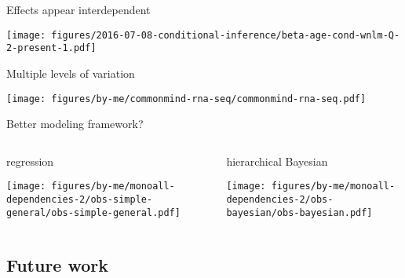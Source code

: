 \documentclass{beamer}
\newcommand{\platefigscale}[0]{0.7}
\begin{document}
\begin{frame}[label=interaction]{Effects appear interdependent}

\texttt{[image: figures/2016-07-08-conditional-inference/beta-age-cond-wnlm-Q-2-present-1.pdf]}
\end{frame}

\begin{frame}{Multiple levels of variation}
\begin{center}
\texttt{[image: figures/by-me/commonmind-rna-seq/commonmind-rna-seq.pdf]}
\end{center}
\end{frame}

\begin{frame}{Better modeling framework?}
\begin{columns}[t]
\begin{column}{0.5\textwidth}
\begin{center}
regression

\texttt{[image: figures/by-me/monoall-dependencies-2/obs-simple-general/obs-simple-general.pdf]}
\end{center}
\end{column}

\begin{column}{0.5\textwidth}
\begin{center}
hierarchical Bayesian

\texttt{[image: figures/by-me/monoall-dependencies-2/obs-bayesian/obs-bayesian.pdf]}
\end{center}
\end{column}
\end{columns}
\end{frame}


\subsection{Future work}
\end{document}
